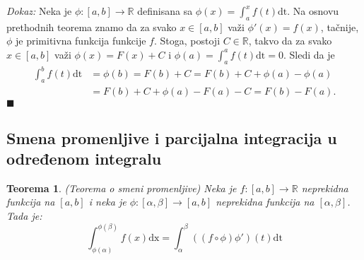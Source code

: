 \documentclass{article}
\newtheorem{teorema}{Teorema}[section]
\begin{document}
\textit{Dokaz:} Neka je $\phi: \left[a, b\right] \longrightarrow \mathbb{R}$ definisana sa
$\phi\left(x\right) = \displaystyle\int^x_a f\left(t\right)\text{dt}$. Na osnovu prethodnih teorema znamo da za svako $x\in \left[a, b\right]$ važi $\phi'\left(x\right) = f\left(x\right)$,
tačnije, $\phi$ je primitivna funkcija funkcije $f$. Stoga, postoji
$C \in \mathbb{R}$, takvo da za svako $x \in \left[a, b\right]$ važi
$\phi\left(x\right) = F\left(x\right) + C$ i $\displaystyle\phi\left(a\right)=\int_{a}^{a} f\left(t\right)\text{dt}=0$. Sledi da je
\begin{align*}
    \displaystyle\int^b_a f\left(t\right)\text{dt} & = \phi\left(b\right) = F\left(b\right) + C = F\left(b\right) +C+ \phi\left(a\right) - \phi\left(a\right) \\
                                                   & = F\left(b\right) +C+ \phi\left(a\right) - F\left(a\right)-C = F\left(b\right) - F\left(a\right).
\end{align*}
\null\hfill $\blacksquare$\par

\subsection{Smena promenljive i parcijalna integracija u određenom integralu}

\begin{teoremabox}
    \label{teorema_2.10}
    \begin{teorema}
        (Teorema o smeni promenljive) Neka je $f:\left[a, b\right]\longrightarrow \mathbb{R}$ neprekidna funkcija na $\left[a,b\right]$ i neka je $\phi: \left[\alpha, \beta\right] \longrightarrow \left[a, b\right]$ neprekidna funkcija na $\left[\alpha, \beta\right]$. Tada je:
        $$\displaystyle \int^{\phi\left(\beta\right)}_{\phi\left(\alpha\right)} f\left(x\right)\text{dx} = \int^\beta_\alpha \left(\left(f\circ\phi\right)\phi'\right)\left(t\right)\text{dt}$$
    \end{teorema}
\end{teoremabox}
\end{document}
